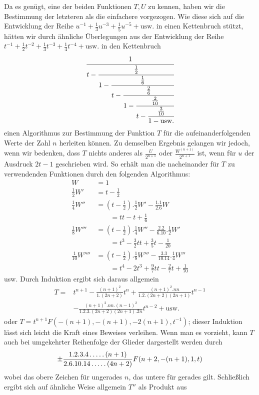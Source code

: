 Da es genügt, eine der beiden Funktionen $T,U$ zu kennen, haben wir die Bestimmung der letzteren als die einfachere vorgezogen. Wie diese sich auf die Entwicklung der Reihe $u^{-1}+\frac13u^{-3}+\frac15u^{-5}+\text{usw.}$ in einen Kettenbruch stützt, hätten wir durch ähnliche Überlegungen aus der Entwicklung der Reihe $t^{-1}+\frac12t^{-2}+\frac13t^{-3}+\frac14t^{-4}+\text{usw.}$ in den Kettenbruch
\[
\cfrac1{t-\cfrac{\frac12}{1-\cfrac{\frac16}
{t-\cfrac{\frac26}{1-\cfrac{\frac2{10}}
{t-\cfrac{\frac3{10}}{1-\mathrm{usw.}}}}}}}
\]
einen Algorithmus zur Bestimmung der Funktion $T$ für die aufeinanderfolgenden Werte der Zahl $n$ herleiten können. Zu demselben Ergebnis gelangen wir jedoch, wenn wir bedenken, dass $T$ nichts anderes als $\frac U{2^{n+1}}$ oder $\frac{W^{(n+1)}}{2^{n+1}}$ ist, wenn für $u$ der Ausdruck $2t-1$ geschrieben wird. So erhält man die nacheinander für $T$ zu verwendenden Funktionen durch den folgenden Algorithmus:
\[
\begin{aligned}
W&=1\\
\tfrac12W'&=t-\tfrac12\\
\tfrac14W''&=(t-\tfrac12).\tfrac12W'-\frac{1.1}{2.6}W
\\[3pt]&\qquad=tt-t+\tfrac16\\
\tfrac18W'''&=(t-\tfrac12).\tfrac14W''-\frac{2.2}{6.10}.\tfrac12W'
\\[3pt]&\qquad=t^3-\tfrac32tt+\tfrac35t-\tfrac1{20}\\
\tfrac1{10}W''''&=(t-\tfrac12).\tfrac18W'''-\frac{3.3}{10.14}.\tfrac14W''
\\[3pt]&\qquad=t^4-2t^3+\tfrac97tt-\tfrac27t+\tfrac1{70}
\end{aligned}
\]
usw. Durch Induktion ergibt sich daraus allgemein
\[
\begin{aligned}
T={}&t^{n+1}-\frac{(n+1)^2}{1.(2n+2)}t^n
+\frac{(n+1)^2.nn}{1.2.(2n+2)(2n+1)}t^{n-1}\\
&-\frac{(n+1)^2.nn.(n-1)^2}{1.2.3.(2n+2)(2n+1).2n}t^{n-2}
+\mathrm{usw.}
\end{aligned}
\]
oder $T=t^{n+1}F(-(n+1),-(n+1),-2(n+1),t^{-1})$; dieser Induktion lässt sich leicht die Kraft eines Beweises verleihen. Wenn man es vorzieht, kann $T$ auch bei umgekehrter Reihenfolge der Glieder dargestellt werden durch
\[
\pm\frac{1.2.3.4\mathinner{.\,.\,.\,.\,.}(n+1)}
{2.6.10.14\mathinner{.\,.\,.\,.\,.}(4n+2)}
F(n+2,-(n+1),1,t)
\]
wobei das obere Zeichen für ungerades $n$, das untere für gerades gilt. Schließlich ergibt sich auf ähnliche Weise allgemein $T''$ als Produkt aus
